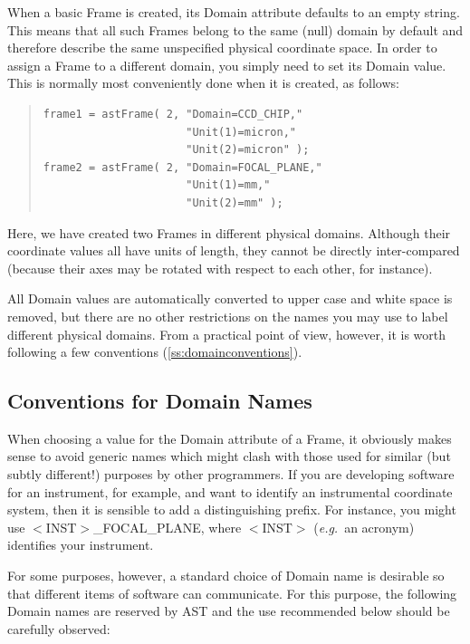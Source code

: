 \documentclass[twoside,11pt]{article}
\newcommand{\htmlref}[2]{#1}
\newcommand{\secref}[1]{\S\ref{#1}}
\renewcommand{\secref}[1]{\ref{#1}}
\begin{document}
When a basic Frame is created, its Domain attribute defaults to an
empty string. This means that all such Frames belong to the same
(null) domain by default and therefore describe the same unspecified
physical coordinate space. In order to assign a Frame to a different
domain, you simply need to set its Domain value. This is normally most
conveniently done when it is created, as follows:

\begin{quote}
\small
\begin{verbatim}
frame1 = astFrame( 2, "Domain=CCD_CHIP,"
                      "Unit(1)=micron,"
                      "Unit(2)=micron" );
frame2 = astFrame( 2, "Domain=FOCAL_PLANE,"
                      "Unit(1)=mm,"
                      "Unit(2)=mm" );
\end{verbatim}
\normalsize
\end{quote}

Here, we have created two Frames in different physical
domains. Although their coordinate values all have units of length,
they cannot be directly inter-compared (because their axes may be
rotated with respect to each other, for instance).

All Domain values are automatically converted to upper case and white
space is removed, but there are no other restrictions on the names you
may use to label different physical domains. From a practical point of
view, however, it is worth following a few conventions
(\secref{ss:domainconventions}).

\subsection{\label{ss:domainconventions}Conventions for Domain Names}

When choosing a value for the \htmlref{Domain}{Domain} attribute of a \htmlref{Frame}{Frame}, it
obviously makes sense to avoid generic names which might clash with
those used for similar (but subtly different!) purposes by other
programmers. If you are developing software for an instrument, for
example, and want to identify an instrumental coordinate system, then
it is sensible to add a distinguishing prefix. For instance, you might
use $<$INST$>$\_FOCAL\_PLANE, where $<$INST$>$ ({\em{e.g.}}\ an
acronym) identifies your instrument.

For some purposes, however, a standard choice of Domain name is
desirable so that different items of software can communicate. For
this purpose, the following Domain names are reserved by AST and the
use recommended below should be carefully observed:
\end{document}
